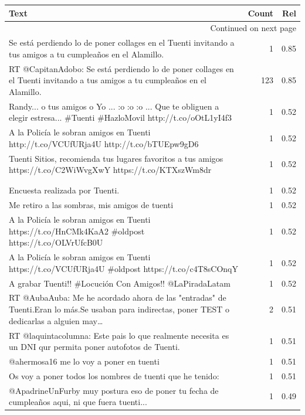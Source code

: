 \begin{longtable}{p{12.5cm}rr}
\toprule
Text & Count & Rel \\
\midrule
\endhead
\midrule
\multicolumn{3}{r}{{Continued on next page}} \\
\midrule
\endfoot

\bottomrule
\endlastfoot
Se está perdiendo lo de poner collages en el Tuenti invitando a tus amigos a tu cumpleaños en el Alamillo. & 1 & 0.85 \\
RT @CapitanAdobo: Se está perdiendo lo de poner collages en el Tuenti invitando a tus amigos a tu cumpleaños en el Alamillo. & 123 & 0.85 \\
Randy... o tus amigos o Yo ... :o :o :o ... Que te obliguen a elegir estresa... \#Tuenti \#HazloMovil http://t.co/oOtL1yI4f3 & 1 & 0.52 \\
A la Policía le sobran amigos en Tuenti http://t.co/VCUfURja4U http://t.co/bTUEpw9gD6 & 1 & 0.52 \\
Tuenti Sitios, recomienda tus lugares favoritos a tus amigos https://t.co/C2WiWvgXwY https://t.co/KTXszWm8dr & 1 & 0.52 \\
\begin{tabular}[c]{@{}l@{}}Por qué no tengo amigos?  \\  \\ Encuesta realizada por Tuenti.\end{tabular} & 1 & 0.52 \\
Me retiro a las sombras, mis amigos de tuenti & 1 & 0.52 \\
A la Policía le sobran amigos en Tuenti https://t.co/HnCMk4KaA2 \#oldpost https://t.co/OLVrUfcB0U & 1 & 0.52 \\
A la Policía le sobran amigos en Tuenti https://t.co/VCUfURja4U \#oldpost https://t.co/c4T8sCOnqY & 1 & 0.52 \\
A grabar Tuenti!! \#Locución Con Amigos!! @LaPiradaLatam & 1 & 0.52 \\
RT @AubaAuba: Me he acordado ahora de las "entradas" de Tuenti.Eran lo más.Se usaban para indirectas, poner TEST o dedicarlas a alguien may… & 2 & 0.51 \\
RT @laquintacolumna: Este pais lo que realmente necesita es un DNI qur permita poner autofotos de Tuenti. & 1 & 0.51 \\
@ahermosa16 me lo voy a poner en tuenti & 1 & 0.51 \\
Os voy a poner todos los nombres de tuenti que he tenido: & 1 & 0.51 \\
@ApadrineUnFurby muy postura eso de poner tu fecha de cumpleaños aqui, ni que fuera tuenti... & 1 & 0.49 \\

\end{longtable}
